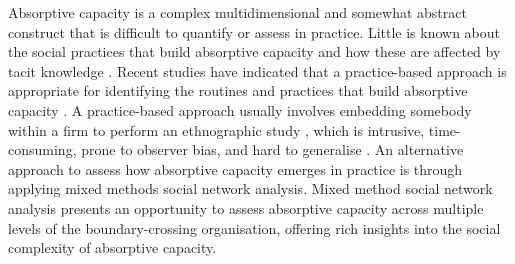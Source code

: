 Absorptive capacity is a complex multidimensional and somewhat abstract construct that is difficult to quantify or assess in practice. Little is known about the social practices that build absorptive capacity and how these are affected by tacit knowledge \citep{tortoriello2015social,lichtenthaler2016absorptive}. Recent studies have indicated that a practice-based approach is appropriate for identifying the routines and practices that build absorptive capacity \citep{duchek2013capturing,omidvar2013revisiting,marabelli2014knowing}. A practice-based approach usually involves embedding somebody within a firm to perform an ethnographic study \citep{duchek2013capturing}, which is intrusive, time-consuming, prone to observer bias, and hard to generalise \citep{goodson2011overview}. An alternative approach to assess how absorptive capacity emerges in practice is through applying mixed methods social network analysis. Mixed method social network analysis presents an opportunity to assess absorptive capacity across multiple levels of the boundary-crossing organisation, offering rich insights into the social complexity of absorptive capacity. \medskip 




